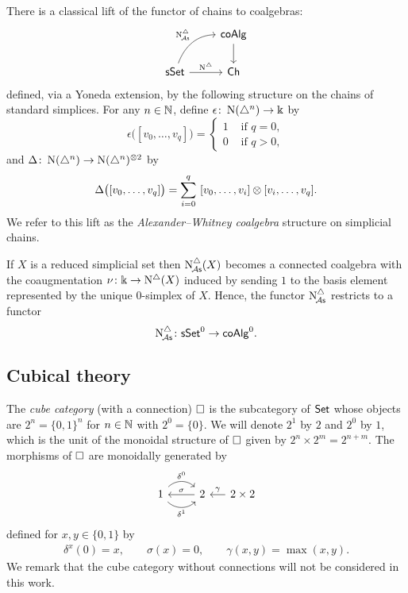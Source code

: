 There is a classical lift of the functor of chains to coalgebras:
\[
\begin{tikzcd}
	& \coAlg \arrow[d] \\
	\sSet \arrow[r, "\schains"] \arrow[ur, "\schainsA", out=70, in=180] & \Ch
\end{tikzcd}
\]
defined, via a Yoneda extension, by the following structure on the chains of standard simplices.
For any $n \in \mathbb{N}$, define $\epsilon \colon \operatorname{N}(\triangle^n) \to \Bbbk$ by
\[
\epsilon \big( [v_0, \dots, v_q] \big) = \begin{cases} 1 & \text{ if } q = 0, \\ 0 & \text{ if } q>0, \end{cases}
\]
and $\Delta \colon \operatorname{N}(\triangle^n) \to \operatorname{N}(\triangle^n)^{\otimes2}$ by
\[
\Delta \big( [v_0, \dots, v_q] \big) = \sum_{i=0}^q \ [v_0, \dots, v_i] \otimes [v_i, \dots, v_q].
\]
We refer to this lift as the \textit{Alexander--Whitney coalgebra} structure on simplicial chains.

If $X$ is a reduced simplicial set then $\operatorname{N^{\triangle}_{\!{\mathcal{A}\mathsf{s}}}}(X)$ becomes a connected coalgebra with the coaugmentation $\nu \colon \Bbbk \to \operatorname{N^{\triangle}}(X)$ induced by sending $1$ to the basis element represented by the unique $0$-simplex of $X$.
Hence, the functor $\operatorname{N^{\triangle}_{\!{\mathcal{A}\mathsf{s}}}}$ restricts to a functor
\[
\operatorname{N^{\triangle}_{\!{\mathcal{A}\mathsf{s}}}} \colon \mathsf{sSet}^0 \to \mathsf{coAlg}^0.
\]

\subsection{Cubical theory}\label{ss:cubical}

The \textit{cube category} (with a connection) $\square$ is the subcategory of $\mathsf{Set}$ whose objects are $2^n = \{0, 1\}^n$ for $n \in \mathbb{N}$ with $2^0 = \{0\}$.
We will denote $2^1$ by $2$ and $2^0$ by $1$, which is the unit of the monoidal structure of $\square$ given by $2^n \times 2^m = 2^{n+m}$.
The morphisms of $\square$ are monoidally generated by
\[
\begin{tikzcd}
	1 \arrow[r, out=45, in=135, "\delta^0"] \arrow[r, out=-45, in=-135, "\delta^1"'] & 2 \arrow[l, "\sigma"'] &[-10pt] \arrow[l, "\gamma"'] 2 \times 2
\end{tikzcd}
\]
defined for $x, y \in \{0,1\}$ by
\begin{gather*}
	\delta^x(0) = x, \qquad
	\sigma(x) = 0, \qquad
	\gamma(x,y) = \max(x,y).
\end{gather*}
We remark that the cube category without connections will not be considered in this work.

